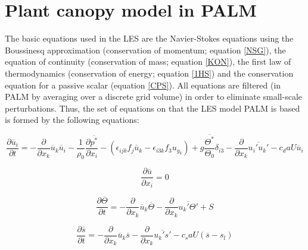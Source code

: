 \documentclass[11pt,a4paper,titlepage]{scrreprt}
\begin{document}
\pagebreak

\chapter{Plant canopy model in PALM}
The basic equations used in the LES are the Navier-Stokes equations using the Boussinesq approximation (conservation of momentum; equation \ref{NSG}), 
the equation of continuity (conservation of mass; equation \ref{KON}), the first law of thermodynamics (conservation of energy; equation \ref{1HS}) and 
the conservation equation for a passive scalar (equation \ref{CPS}). All equations are filtered (in PALM by averaging over a discrete grid volume) in 
order to eliminate small-scale perturbations. Thus, the set of equations on that the LES model PALM is based is formed by the following equations:  

\begin{equation} \label{NSG}
\frac{\partial \overline{u}_i}{\partial t} = - \frac{\partial}{\partial x_k} \overline{u}_k \overline{u}_i - \frac{1}{\rho_0} \frac{\partial \overline{p^{\ast}}}{\partial x_i} - \left ( \epsilon_{ijk} f_j \overline{u}_k - \epsilon_{i3k} f_3 u_{g_k} \right ) + g \frac{\overline{\Theta^{\ast}}}{\Theta_0} \delta_{i3} - \frac{\partial}{\partial x_k} \overline{u_i'u_k'} - c_d a U \overline{u}_i
\end{equation}

\begin{equation} \label{KON} 
\frac{\partial \overline{u}}{\partial x_i} = 0
\end{equation}

\begin{equation} \label{1HS}
\frac{\partial \overline{\Theta}}{\partial t} = - \frac {\partial}{\partial x_k} \overline{u}_k \overline{\Theta} - \frac{\partial}{\partial x_k} \overline{u_k'\Theta'} + S
\end{equation}

\begin{equation} \label{CPS}
\frac{\partial \overline s}{\partial t} = - \frac{\partial}{\partial x_k} \overline{u}_k \overline{s} - \frac{\partial}{\partial x_k} \overline{u_k's'} - c_s a U \left ( \overline{s} - s_l \right )
\end{equation}
\end{document}

